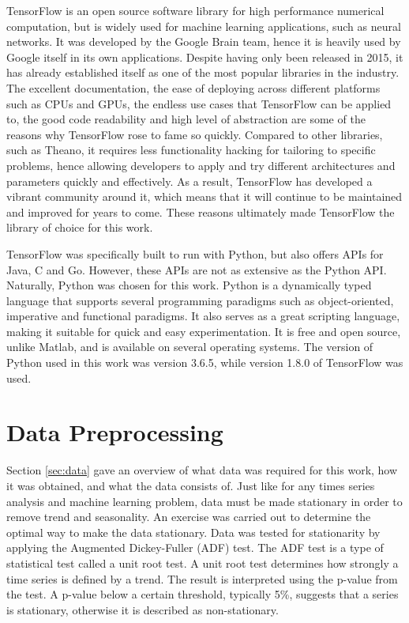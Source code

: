 \documentclass{UoYCSproject}
\begin{document}
TensorFlow is an open source software library for high performance numerical computation, but is widely used for machine learning applications, such as neural networks. It was developed by the Google Brain team, hence it is heavily used by Google itself in its own applications. Despite having only been released in 2015, it has already established itself as one of the most popular libraries in the industry. The excellent documentation, the ease of deploying across different platforms such as CPUs and GPUs, the endless use cases that TensorFlow can be applied to, the good code readability and high level of abstraction are some of the reasons why TensorFlow rose to fame so quickly. Compared to other libraries, such as Theano, it requires less functionality hacking for tailoring to specific problems, hence allowing developers to apply and try different architectures and parameters quickly and effectively. As a result, TensorFlow has developed a vibrant community around it, which means that it will continue to be maintained and improved for years to come. These reasons ultimately made TensorFlow the library of choice for this work.         

TensorFlow was specifically built to run with Python, but also offers APIs for Java, C and Go. However, these APIs are not as extensive as the Python API. Naturally, Python was chosen for this work. Python is a dynamically typed language that supports several programming paradigms such as object-oriented, imperative and functional paradigms. It also serves as a great scripting language, making it suitable for quick and easy experimentation. It is free and open source, unlike Matlab, and is available on several operating systems. The version of Python used in this work was version 3.6.5, while version 1.8.0 of TensorFlow was used.

\section{Data Preprocessing}
\label{sec:datapreprocessing}
Section \ref{sec:data} gave an overview of what data was required for this work, how it was obtained, and what the data consists of. Just like for any times series analysis and machine learning problem, data must be made stationary in order to remove trend and seasonality. An exercise was carried out to determine the optimal way to make the data stationary. Data was tested for stationarity by applying the Augmented Dickey-Fuller (ADF) test. The ADF test is a type of statistical test called a unit root test. A unit root test determines how strongly a time series is defined by a trend. The result is interpreted using the p-value from the test. A p-value below a certain threshold, typically 5\%, suggests that a series is stationary, otherwise it is described as non-stationary. 
\end{document}
